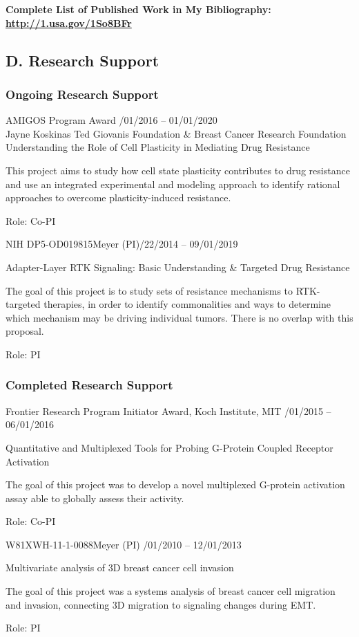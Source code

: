 \documentclass[11pt]{article}
\begin{document}
\textbf{Complete List of Published Work in My Bibliography: \url{http://1.usa.gov/1So8BFr}}





\cleardoublepage

\subsection{D. Research Support}

\subsubsection{Ongoing Research Support}

AMIGOS Program Award \tab {}/01/2016 -- 01/01/2020 \\
Jayne Koskinas Ted Giovanis Foundation \& Breast Cancer Research Foundation\\
Understanding the Role of Cell Plasticity in Mediating Drug Resistance

This project aims to study how cell state plasticity contributes to drug resistance and use an integrated experimental and modeling approach to identify rational approaches to overcome plasticity-induced resistance.

Role: Co-PI

\vspace{12pt}

NIH DP5-OD019815\tab  Meyer (PI)/22/2014 -- 09/01/2019

Adapter-Layer RTK Signaling: Basic Understanding \& Targeted Drug Resistance

The goal of this project is to study sets of resistance mechanisms to RTK-targeted therapies, in order to identify commonalities and ways to determine which mechanism may be driving individual tumors. There is no overlap with this proposal.

Role: PI

\subsubsection{Completed Research Support}

Frontier Research Program Initiator Award, Koch Institute, MIT /01/2015 -- 06/01/2016

Quantitative and Multiplexed Tools for Probing G-Protein Coupled Receptor Activation

The goal of this project was to develop a novel multiplexed G-protein activation assay able to globally assess their activity.

Role: Co-PI

\vspace{12pt}



W81XWH-11-1-0088\tab Meyer (PI) /01/2010 -- 12/01/2013

Multivariate analysis of 3D breast cancer cell invasion

The goal of this project was a systems analysis of breast cancer cell migration and invasion, connecting 3D migration to signaling changes during EMT.

Role: PI
\end{document}
